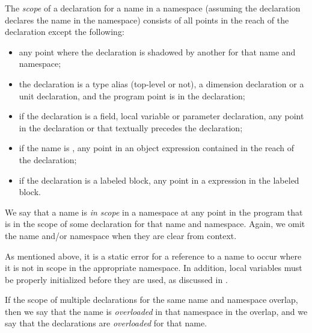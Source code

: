 The \emph{scope} of a declaration for a name in a namespace 
(assuming the declaration declares the name in the namespace) 
consists of all points in the reach of the declaration except the following:
\begin{itemize}

\item
any point where the declaration is shadowed by another 
for that name and namespace;

\item
the declaration is a type alias (top-level or not),
a dimension declaration or a unit declaration,
and the program point is in the declaration;

\item
if the declaration is a field, local variable or parameter declaration, 
any point in the declaration or that textually precedes the declaration;

\item
if the name is , 
any point in an object expression 
contained in the reach of the declaration;

\item
if the declaration is a labeled block,
any point in a  expression
in the labeled block.

\end{itemize}
We say that a name is \emph{in scope} in a namespace 
at any point in the program 
that is in the scope of some declaration for that name and namespace.
Again, we omit the name and/or namespace when they are clear from context.

As mentioned above,
it is a static error for a reference to a name to occur 
where it is not in scope in the appropriate namespace.
In addition, 
local variables must be properly initialized before they are used, 
as discussed in .

If the scope of multiple declarations for the same name and namespace overlap, 
then we say that the name is \emph{overloaded} in that namespace 
in the overlap, 
and we say that the declarations are \emph{overloaded} for that name.

